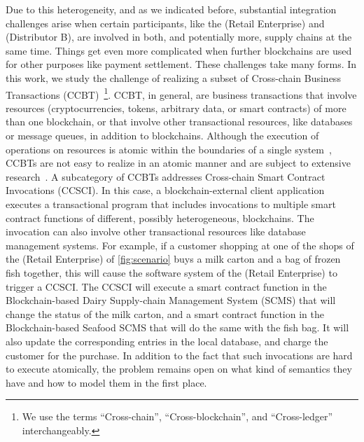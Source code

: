 \documentclass[review]{elsarticle}
\begin{document}
Due to this heterogeneity, and as we indicated before, substantial integration challenges arise when certain participants, like the (Retail Enterprise) and (Distributor B), are involved in both, and potentially more, supply chains at the same time.
Things get even more complicated when further blockchains are used for other purposes like payment settlement.
These challenges take many forms.
In this work, we study the challenge of realizing a subset of Cross-chain Business Transactions (CCBT)~\footnote{We use the terms \enquote{Cross-chain}, \enquote{Cross-blockchain}, and \enquote{Cross-ledger} interchangeably.}.
CCBT, in general, are business transactions that involve resources (cryptocurrencies, tokens, arbitrary data, or smart contracts) of more than one blockchain, or that involve other transactional resources, like databases or message queues, in addition to blockchains.
Although the execution of operations on resources is atomic within the boundaries of a single system~\cite{Tai2017SALT}, CCBTs are not easy to realize in an atomic manner and are subject to extensive research~\cite{Qasse2019,Zakhary2019TransactionalSmartContracts,Siris2019,Zamyatin2019SoKCA,Borkowski2019}.
A subcategory of CCBTs addresses Cross-chain Smart Contract Invocations (CCSCI).
In this case, a blockchain-external client application executes a transactional program that includes invocations to multiple smart contract functions of different, possibly heterogeneous, blockchains.
The invocation can also involve other transactional resources like database management systems.
For example, if a customer shopping at one of the shops of the (Retail Enterprise) of \cref{fig:scenario} buys a milk carton and a bag of frozen fish together, this will cause the software system of the (Retail Enterprise) to trigger a CCSCI.
The CCSCI will execute a smart contract function in the Blockchain-based Dairy Supply-chain Management System (SCMS) that will change the status of the milk carton, and a smart contract function in the Blockchain-based Seafood SCMS that will do the same with the fish bag.
It will also update the corresponding entries in the local database, and charge the customer for the purchase.
In addition to the fact that such invocations are hard to execute atomically, the problem remains open on what kind of semantics they have and how to model them in the first place.
\end{document}
